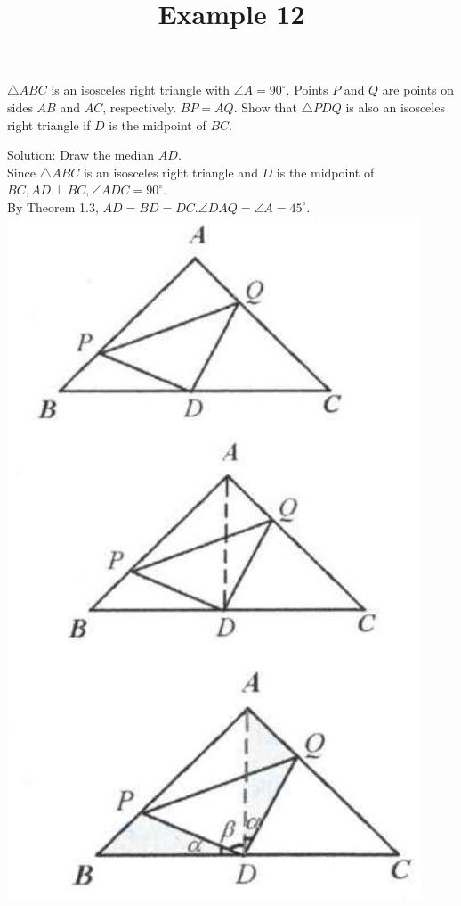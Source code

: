 \documentclass{article}
\title{Example 12}
\date{}
\begin{document}
\maketitle

\(\triangle A B C\) is an isosceles right triangle with \(\angle A=90^{\circ}\). Points \(P\) and \(Q\) are points on sides \(A B\) and \(A C\), respectively. \(B P=A Q\). Show that \(\triangle P D Q\) is also an isosceles right triangle if \(D\) is the midpoint of \(B C\).

Solution:
Draw the median \(A D\).\\
Since \(\triangle A B C\) is an isosceles right triangle and \(D\) is the midpoint of \(B C, A D \perp B C, \angle A D C=90^{\circ}\).\\
By Theorem 1.3, \(A D=B D=D C . \angle D A Q=\angle A=45^{\circ}\).\\
\centering
\includegraphics[width=\textwidth]{images/013(1).jpg}
\end{document}
